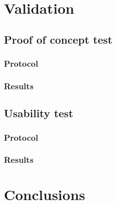 \documentclass[binding=0.6cm,LaM]{sapthesis}
\begin{document}
\chapter{Validation}
\section{Proof of concept test}

\subsection{Protocol}

\subsection{Results}

\section{Usability test}

\subsection{Protocol}

\subsection{Results}

\chapter{Conclusions}

\backmatter
\cleardoublepage
{} %


\end{document}
